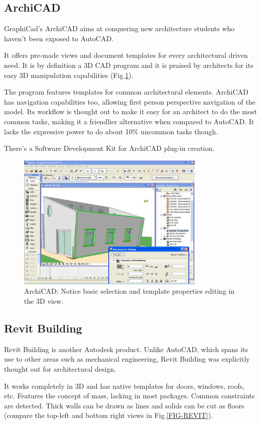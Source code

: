 \subsection{ArchiCAD}
GraphiCad's ArchiCAD\cite{SITE-ARCHICAD} aims at conquering new architecture students who haven't been exposed to AutoCAD.

It offers pre-made views and document templates for every architectural driven need.
It is by definition a 3D CAD program and it is praised by architects for its easy 3D
manipulation capabilities (Fig.\ref{FIG-ARCHICAD}).

The program features templates for common architectural elements.
ArchiCAD has navigation capabilities too, allowing first person perspective navigation of the model.
Its workflow is thought out to make it easy for an architect to do the most common tasks,
making it a friendlier alternative when compared to AutoCAD.
It lacks the expressive power to do about 10\% uncommon tasks though.

There's a Software Development Kit for ArchiCAD plug-in creation.

\begin{figure}[!ht]
    \centering
    \includegraphics[width=9cm]{gfx/archicad-1.png}
    \caption{ArchiCAD: Notice basic selection and template properties editing in the 3D view.}
    \label{FIG-ARCHICAD}
\end{figure}

\subsection{Revit Building}
Revit Building\cite{SITE-REVIT} is another Autodesk product.
Unlike AutoCAD, which spans its use to other areas such as mechanical engineering,
Revit Building was explicitly thought out for architectural design.

It works completely in 3D and has native templates for doors, windows, roofs, etc.
Features the concept of mass, lacking in most packages.
Common constraints are detected. Thick walls can be drawn as lines and solids can
be cut as floors (compare the top-left and bottom right views in Fig.\ref{FIG-REVIT}).

